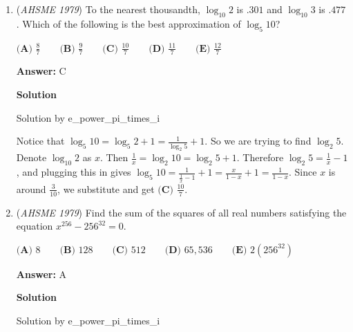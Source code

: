 \begin{enumerate}
 \textbf{Answer: }C



\textbf{Solution}

Solution by e\_power\_pi\_times\_i

 We know that this triangle has lengths of $x$, $y-x$, and $z-y$. Using the Triangle Inequality, we get $3$ inequalities: $2y>z, z>2x, 2x+z>0$. Therefore, we know that $\textbf{I}$ is true and $\textbf{III}$ is false. In $\textbf{II}$, we have to prove $2y<2x+z$. We know that $2y>z$, so we have to prove $z<2y<2x+z$. $2x<z$, so we have to prove that $z<2z$, which is true for all positive $z$. Therefore the answer is $\boxed{\textbf{(C) } \textbf{I. }\text{and }\textbf{II. }\text{only}}$.

 


	\item (\textit{AHSME 1979}) To the nearest thousandth, $\log_{10}2$ is $.301$ and $\log_{10}3$ is $.477$. 
Which of the following is the best approximation of $\log_5 10$?


 $\textbf{(A) }\frac{8}{7}\qquad \textbf{(B) }\frac{9}{7}\qquad \textbf{(C) }\frac{10}{7}\qquad \textbf{(D) }\frac{11}{7}\qquad \textbf{(E) }\frac{12}{7}$

 \textbf{Answer: }C



\textbf{Solution}

Solution by e\_power\_pi\_times\_i

 Notice that $\log_5 10 = \log_5 2 + 1 = \frac{1}{\log_2 5} + 1$. So we are trying to find $\log_2 5$. Denote $\log_{10}2$ as $x$. Then $\frac{1}{x} = \log_2 10 = \log_2 5 + 1$. Therefore $\log_2 5 = \frac{1}{x}-1$, and plugging this in gives $\log_5 10 = \frac{1}{\frac{1}{x}-1}+1 = \frac{x}{1-x}+1 = \frac{1}{1-x}$. Since $x$ is around $\frac{3}{10}$, we substitute and get $\boxed{\textbf{(C) }\frac{10}{7}}$.

 


	\item (\textit{AHSME 1979}) Find the sum of the squares of all real numbers satisfying the equation $x^{256}-256^{32}=0$.


 $\textbf{(A) }8\qquad \textbf{(B) }128\qquad \textbf{(C) }512\qquad \textbf{(D) }65,536\qquad \textbf{(E) }2(256^{32})$

 \textbf{Answer: }A



\textbf{Solution}

Solution by e\_power\_pi\_times\_i


\end{enumerate}
